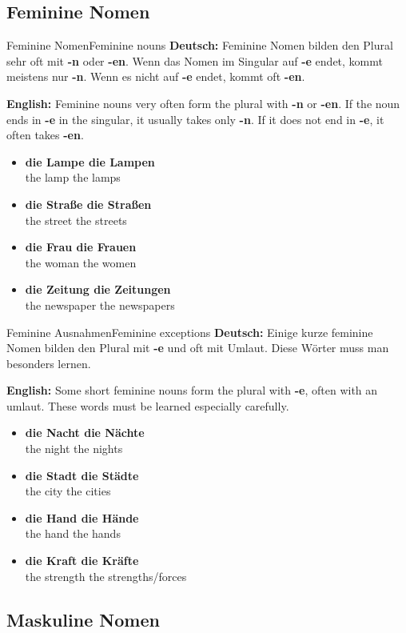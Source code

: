 \documentclass[a4paper,11pt]{article}
\newcommand{\GermanText}[1]{\textbf{Deutsch: }#1\par}
\newcommand{\EnglishText}[1]{{\small\color{SoftGray}\textbf{English: }#1\par}}
\newcommand{\ExampleItem}[2]{\item \textbf{#1}\\{\small\color{SoftGray}#2}}
\begin{document}
\subsection{Feminine Nomen}

\begin{grammarentry}{Feminine Nomen}{Feminine nouns}
\GermanText{Feminine Nomen bilden den Plural sehr oft mit \textbf{-n} oder \textbf{-en}. Wenn das Nomen im Singular auf \textbf{-e} endet, kommt meistens nur \textbf{-n}. Wenn es nicht auf \textbf{-e} endet, kommt oft \textbf{-en}.}
\EnglishText{Feminine nouns very often form the plural with \textbf{-n} or \textbf{-en}. If the noun ends in \textbf{-e} in the singular, it usually takes only \textbf{-n}. If it does not end in \textbf{-e}, it often takes \textbf{-en}.}
\begin{exbox}
\begin{itemize}
\ExampleItem{die Lampe \textrightarrow{} die Lampen}{the lamp \textrightarrow{} the lamps}
\ExampleItem{die Straße \textrightarrow{} die Straßen}{the street \textrightarrow{} the streets}
\ExampleItem{die Frau \textrightarrow{} die Frauen}{the woman \textrightarrow{} the women}
\ExampleItem{die Zeitung \textrightarrow{} die Zeitungen}{the newspaper \textrightarrow{} the newspapers}
\end{itemize}
\end{exbox}
\end{grammarentry}

\begin{grammarentry}{Feminine Ausnahmen}{Feminine exceptions}
\GermanText{Einige kurze feminine Nomen bilden den Plural mit \textbf{-e} und oft mit Umlaut. Diese Wörter muss man besonders lernen.}
\EnglishText{Some short feminine nouns form the plural with \textbf{-e}, often with an umlaut. These words must be learned especially carefully.}
\begin{exbox}
\begin{itemize}
\ExampleItem{die Nacht \textrightarrow{} die Nächte}{the night \textrightarrow{} the nights}
\ExampleItem{die Stadt \textrightarrow{} die Städte}{the city \textrightarrow{} the cities}
\ExampleItem{die Hand \textrightarrow{} die Hände}{the hand \textrightarrow{} the hands}
\ExampleItem{die Kraft \textrightarrow{} die Kräfte}{the strength \textrightarrow{} the strengths/forces}
\end{itemize}
\end{exbox}
\end{grammarentry}

\subsection{Maskuline Nomen}
\end{document}
